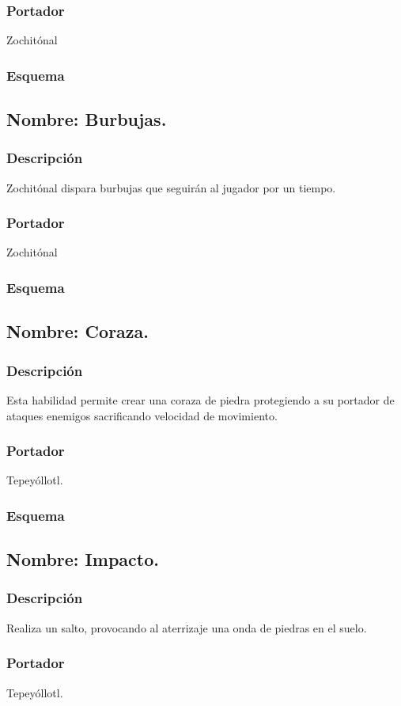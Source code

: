 \documentclass[11pt,letterpaper]{article}
\begin{document}
\subsubsection{Portador}
Zochitónal
\subsubsection{Esquema}
\subsection{Nombre: Burbujas.}
\subsubsection{Descripción}
Zochitónal dispara burbujas que seguirán al jugador por un tiempo.  
\subsubsection{Portador}
Zochitónal
\subsubsection{Esquema}
\subsection{Nombre: Coraza.}
\subsubsection{Descripción}
Esta habilidad permite crear una coraza de piedra protegiendo a su portador de ataques enemigos sacrificando velocidad de movimiento.  
\subsubsection{Portador}
Tepeyóllotl.
\subsubsection{Esquema}
\subsection{Nombre: Impacto.}
\subsubsection{Descripción}
Realiza un salto, provocando al aterrizaje una onda de piedras en el suelo.
\subsubsection{Portador}
Tepeyóllotl.
\end{document}
